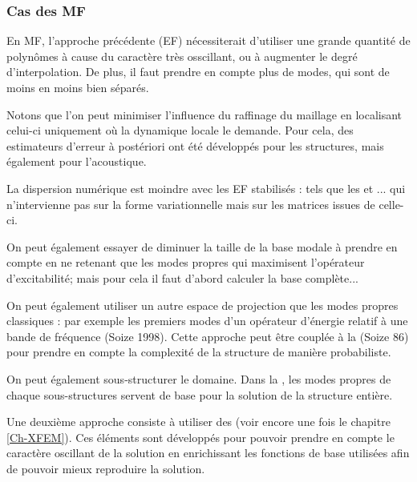 \medskip
\subsubsection{Cas des MF}

En MF, l'approche précédente (EF) nécessiterait d'utiliser une grande quantité de polynômes 
à cause du caractère très osscillant, ou à augmenter le degré d'interpolation. De plus, il faut
prendre en compte plus de modes, qui sont de moins en moins bien séparés.

\medskip
Notons que l'on peut minimiser l'influence du raffinage du maillage en localisant celui-ci uniquement
où la dynamique locale le demande. Pour cela, des estimateurs d'erreur à postériori ont été
développés pour les structures, mais également pour l'acoustique.

La dispersion numérique est moindre avec les EF stabilisés :  tels que les  et ... 
qui n'intervienne pas sur la forme variationnelle mais sur les matrices issues de celle-ci.

\medskip
On peut également essayer de diminuer la taille de la base modale à prendre en compte en
ne retenant que les modes propres qui maximisent l'opérateur d'excitabilité; mais pour cela
il faut d'abord calculer la base complète...

On peut également utiliser un autre espace de projection que les modes propres classiques :
par exemple les premiers modes d'un opérateur d'énergie relatif à une bande de fréquence
(Soize 1998).
Cette approche peut être couplée à la  
(Soize 86)  pour prendre en compte la complexité de la structure de manière probabiliste.

\medskip
On peut également sous-structurer le domaine.
Dans la , les 
modes propres de chaque sous-structures  servent de base pour la solution 
de la structure entière.

\bigskip
Une \og deuxième \fg{} approche consiste à utiliser des 
(voir encore une fois le chapitre \ref{Ch-XFEM}).
Ces éléments sont développés pour pouvoir prendre en compte le caractère
oscillant de la solution  en enrichissant les fonctions de base utilisées afin de pouvoir
mieux reproduire la solution.

